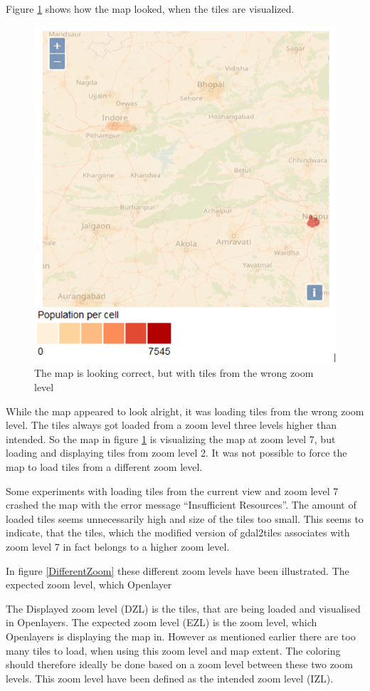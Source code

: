 Figure \ref{MapWithWrongResolution} shows how the map looked, when the tiles are visualized. 

\begin{figure} [H]
	\centering
	\includegraphics[width=.6\textwidth]{Pictures/MapWithWrongResolution}
	\caption{The map is looking correct, but with tiles from the wrong zoom level}
	\label{MapWithWrongResolution}
\end{figure}


While the map appeared to look alright, it was loading tiles from the wrong zoom level. The tiles always got loaded from a zoom level three levels higher than intended. So the map in figure \ref{MapWithWrongResolution} is visualizing the map at zoom level 7, but loading and displaying tiles from zoom level 2. It was not possible to force the map to load tiles from a different zoom level.

Some experiments with loading tiles from the current view and zoom level 7 crashed the map with the error message “Insufficient Resources”. The amount of loaded tiles seems unnecessarily high and size of the tiles too small. This seems to indicate, that the tiles, which the modified version of gdal2tiles associates with zoom level 7 in fact belongs to a higher zoom level.

In figure \ref{DifferentZoom} these different zoom levels have been illustrated. The expected zoom level, which Openlayer

The Displayed zoom level (DZL) is the tiles, that are being loaded and visualised in Openlayers. The expected zoom level (EZL) is the zoom level, which Openlayers is displaying the map in. However as mentioned earlier there are too many tiles to load, when using this zoom level and map extent. The coloring should therefore ideally be done based on a zoom level between these two zoom levels. This zoom level have been defined as the intended zoom level (IZL).

